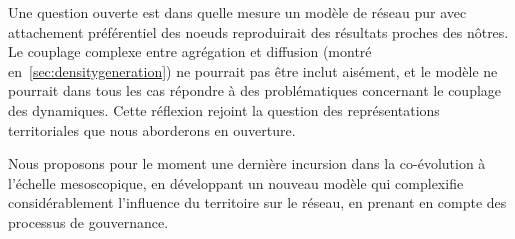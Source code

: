 Une question ouverte est dans quelle mesure un modèle de réseau pur avec attachement préférentiel des noeuds reproduirait des résultats proches des nôtres. Le couplage complexe entre agrégation et diffusion (montré en~\ref{sec:densitygeneration}) ne pourrait pas être inclut aisément, et le modèle ne pourrait dans tous les cas répondre à des problématiques concernant le couplage des dynamiques. Cette réflexion rejoint la question des représentations territoriales que nous aborderons en ouverture.



Nous proposons pour le moment une dernière incursion dans la co-évolution à l'échelle mesoscopique, en développant un nouveau modèle qui complexifie considérablement l'influence du territoire sur le réseau, en prenant en compte des processus de gouvernance. 



\stars





